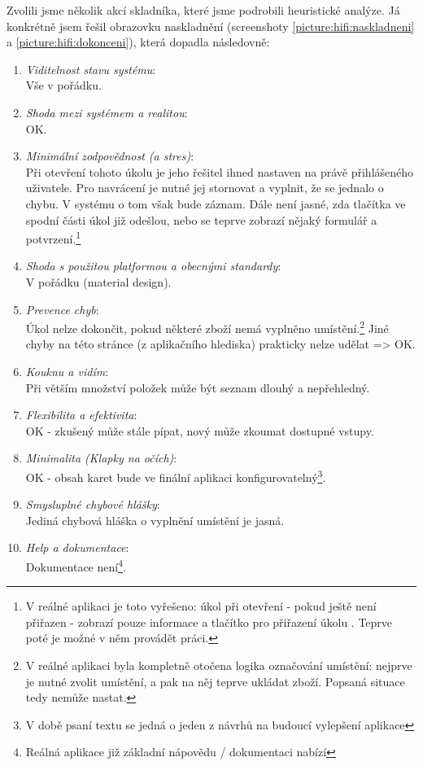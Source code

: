 Zvolili jsme několik akcí skladníka, které jsme podrobili heuristické analýze. Já konkrétně jsem řešil obrazovku naskladnění (screenshoty \ref{picture:hifi:naskladneni} a \ref{picture:hifi:dokonceni}), která dopadla následovně:

\begin{enumerate}
  \item \emph{Viditelnost stavu systému}:\\Vše v pořádku.
  \item \emph{Shoda mezi systémem a realitou}:\\OK.
  \item \emph{Minimální zodpovědnost (a stres)}:\\Při otevření tohoto úkolu je jeho řešitel ihned nastaven na právě přihlášeného uživatele. Pro navrácení je nutné jej stornovat a vyplnit, že se jednalo o chybu. V systému o tom však bude záznam. Dále není jasné, zda tlačítka ve spodní části úkol již odešlou, nebo se teprve zobrazí nějaký formulář a potvrzení.\footnote{V reálné aplikaci je toto vyřešeno: úkol při otevření - pokud ještě není přiřazen - zobrazí pouze informace a tlačítko pro přiřazení úkolu . Teprve poté je možné v něm provádět práci.}
  \item \emph{Shoda s použitou platformou a obecnými standardy}:\\V pořádku (material design).
  \item \emph{Prevence chyb}:\\Úkol nelze dokončit, pokud některé zboží nemá vyplněno umístění.\footnote{V reálné aplikaci byla kompletně otočena logika označování umístění: nejprve je nutné zvolit umístění, a pak na něj teprve ukládat zboží. Popsaná situace tedy nemůže nastat.} Jiné chyby na této stránce (z aplikačního hlediska) prakticky nelze udělat => OK.
  \item \emph{Kouknu a vidím}:\\Při větším množství položek může být seznam dlouhý a nepřehledný.
  \item \emph{Flexibilita a efektivita}:\\OK - zkušený může stále pípat, nový může zkoumat dostupné vstupy.
  \item \emph{Minimalita (Klapky na očích)}:\\OK - obsah karet bude ve finální aplikaci konfigurovatelný\footnote{V době psaní textu se jedná o jeden z návrhů na budoucí vylepšení aplikace}.
  \item \emph{Smysluplné chybové hlášky}:\\Jediná chybová hláška o vyplnění umístění je jasná.
  \item \emph{Help a dokumentace}:\\Dokumentace není\footnote{Reálná aplikace již základní nápovědu / dokumentaci nabízí}.
\end{enumerate}

